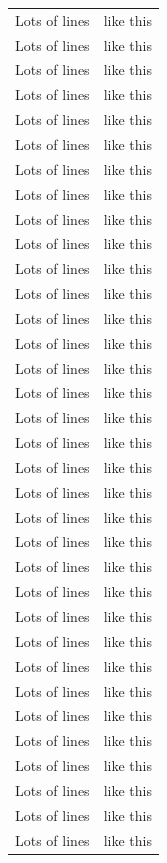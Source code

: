 \begin{longtable}[c]{ | c | c | }
        Lots of lines & like this\\
        Lots of lines & like this\\
        Lots of lines & like this\\
        Lots of lines & like this\\
        Lots of lines & like this\\
        Lots of lines & like this\\
        Lots of lines & like this\\
        Lots of lines & like this\\
        Lots of lines & like this\\
        Lots of lines & like this\\
        Lots of lines & like this\\
        Lots of lines & like this\\
        Lots of lines & like this\\
        Lots of lines & like this\\
        Lots of lines & like this\\
        Lots of lines & like this\\
        Lots of lines & like this\\
        Lots of lines & like this\\
        Lots of lines & like this\\
        Lots of lines & like this\\
        Lots of lines & like this\\
        Lots of lines & like this\\
        Lots of lines & like this\\
        Lots of lines & like this\\
        Lots of lines & like this\\
        Lots of lines & like this\\
        Lots of lines & like this\\
        Lots of lines & like this\\
        Lots of lines & like this\\
        Lots of lines & like this\\
        Lots of lines & like this\\
        Lots of lines & like this\\
        Lots of lines & like this\\
        Lots of lines & like this\\

\end{longtable}
